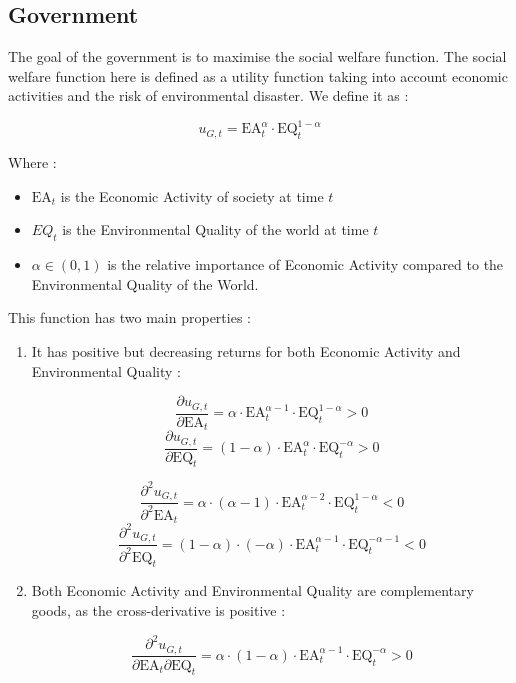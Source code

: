\documentclass{article}
\begin{document}
\subsection{Government}

The goal of the government is to maximise the social welfare function. The social welfare function here is defined as a utility function taking into account economic activities and the risk of environmental disaster. We define it as : 

\begin{equation}
    u_{G,t}=\text{EA}_{t}^{\alpha}\cdot\text{EQ}_{t}^{1-\alpha}
\end{equation}

Where : 
\begin{itemize}
    \item $\text{EA}_{t}$ is the Economic Activity of society at time $t$
    \item $EQ_{t}$ is the Environmental Quality of the world at time $t$
    \item $\alpha \in \left(0,1\right)$ is the relative importance of Economic Activity compared to the Environmental Quality of the World.
\end{itemize}

This function has two main properties : 

\begin{enumerate}
    \item It has positive but decreasing returns for both Economic Activity and Environmental Quality : 

$$\frac{\partial u_{G,t}}{\partial \text{EA}_{t}}=\alpha\cdot\text{EA}_{t}^{\alpha-1}\cdot\text{EQ}_{t}^{1-\alpha}>0$$
$$\frac{\partial u_{G,t}}{\partial \text{EQ}_{t}}=(1-\alpha)\cdot\text{EA}_{t}^{\alpha}\cdot\text{EQ}_{t}^{-\alpha}>0$$

$$\frac{\partial^2 u_{G,t}}{\partial^2 \text{EA}_{t}}=\alpha\cdot(\alpha-1)\cdot\text{EA}_{t}^{\alpha-2}\cdot\text{EQ}_{t}^{1-\alpha}<0$$
$$\frac{\partial^2 u_{G,t}}{\partial^2 \text{EQ}_{t}}=(1-\alpha)\cdot(-\alpha)\cdot\text{EA}_{t}^{\alpha-1}\cdot\text{EQ}_{t}^{-\alpha-1}<0$$

    \item Both Economic Activity and Environmental Quality are complementary goods, as the cross-derivative is positive :
    
$$\frac{\partial^2 u_{G,t}}{\partial \text{EA}_{t} \partial \text{EQ}_{t}}=\alpha\cdot(1-\alpha)\cdot\text{EA}_{t}^{\alpha-1}\cdot\text{EQ}_{t}^{-\alpha}>0$$
\end{enumerate}
\end{document}
